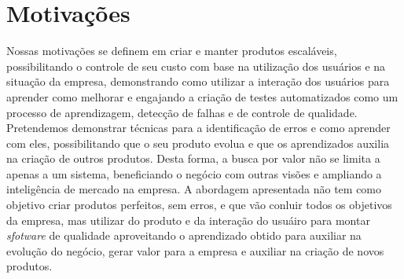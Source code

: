   \section{Motivações}
    Nossas motivações se definem em criar e manter produtos escaláveis,
    possibilitando o controle de seu custo com base na utilização
    dos usuários e na situação da empresa, demonstrando como utilizar a interação
    dos usuários para aprender como melhorar e engajando a criação de testes
    automatizados como um processo de aprendizagem, detecção de falhas e de
    controle de qualidade. \newline
    Pretendemos demonstrar técnicas para a identificação de erros e como
    aprender com eles, possibilitando que o seu produto evolua e que os
    aprendizados auxilia na criação de outros produtos. Desta forma, a busca
    por valor não se limita a apenas a um sistema, beneficiando o negócio com
    outras visões e ampliando a inteligência de mercado na empresa. A abordagem
    apresentada não tem como objetivo criar produtos perfeitos, sem erros, e
    que vão conluir todos os objetivos da empresa, mas utilizar do produto e da
    interação do usuáiro para montar \textit{sfotware} de qualidade aproveitando
    o aprendizado obtido para auxiliar na evolução do negócio, gerar valor para
    a empresa e auxiliar na criação de novos produtos.

